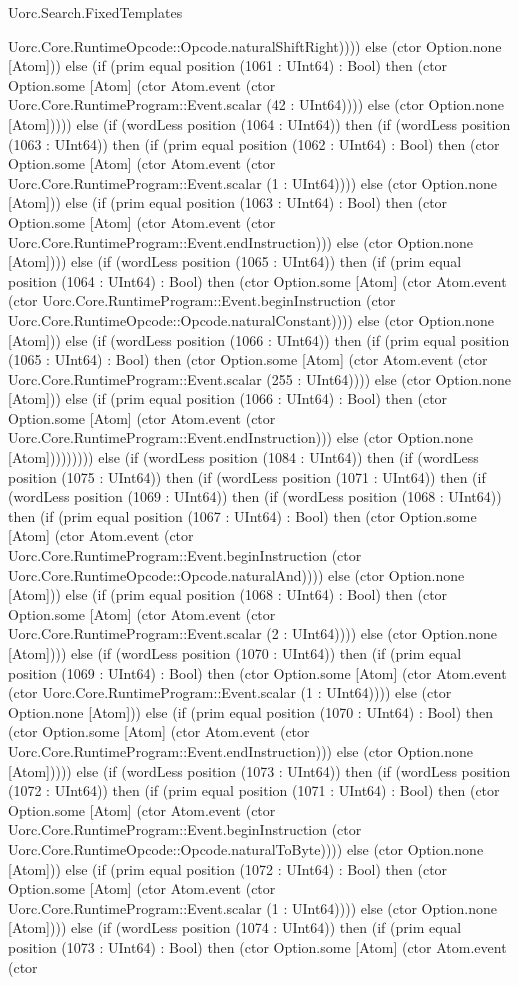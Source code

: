 \begin{lexlean}{Uorc.Search.FixedTemplates}
\begin{semanticmodule}
{Uorc.Core.RuntimeOpcode::Opcode.naturalShiftRight)))) else (ctor Option.none [Atom])) else (if (prim equal position (1061 : UInt64) : Bool) then (ctor Option.some [Atom] (ctor Atom.event (ctor Uorc.Core.RuntimeProgram::Event.scalar (42 : UInt64)))) else (ctor Option.none [Atom])))) else (if (wordLess position (1064 : UInt64)) then (if (wordLess position (1063 : UInt64)) then (if (prim equal position (1062 : UInt64) : Bool) then (ctor Option.some [Atom] (ctor Atom.event (ctor Uorc.Core.RuntimeProgram::Event.scalar (1 : UInt64)))) else (ctor Option.none [Atom])) else (if (prim equal position (1063 : UInt64) : Bool) then (ctor Option.some [Atom] (ctor Atom.event (ctor Uorc.Core.RuntimeProgram::Event.endInstruction))) else (ctor Option.none [Atom]))) else (if (wordLess position (1065 : UInt64)) then (if (prim equal position (1064 : UInt64) : Bool) then (ctor Option.some [Atom] (ctor Atom.event (ctor Uorc.Core.RuntimeProgram::Event.beginInstruction (ctor Uorc.Core.RuntimeOpcode::Opcode.naturalConstant)))) else (ctor Option.none [Atom])) else (if (wordLess position (1066 : UInt64)) then (if (prim equal position (1065 : UInt64) : Bool) then (ctor Option.some [Atom] (ctor Atom.event (ctor Uorc.Core.RuntimeProgram::Event.scalar (255 : UInt64)))) else (ctor Option.none [Atom])) else (if (prim equal position (1066 : UInt64) : Bool) then (ctor Option.some [Atom] (ctor Atom.event (ctor Uorc.Core.RuntimeProgram::Event.endInstruction))) else (ctor Option.none [Atom])))))))) else (if (wordLess position (1084 : UInt64)) then (if (wordLess position (1075 : UInt64)) then (if (wordLess position (1071 : UInt64)) then (if (wordLess position (1069 : UInt64)) then (if (wordLess position (1068 : UInt64)) then (if (prim equal position (1067 : UInt64) : Bool) then (ctor Option.some [Atom] (ctor Atom.event (ctor Uorc.Core.RuntimeProgram::Event.beginInstruction (ctor Uorc.Core.RuntimeOpcode::Opcode.naturalAnd)))) else (ctor Option.none [Atom])) else (if (prim equal position (1068 : UInt64) : Bool) then (ctor Option.some [Atom] (ctor Atom.event (ctor Uorc.Core.RuntimeProgram::Event.scalar (2 : UInt64)))) else (ctor Option.none [Atom]))) else (if (wordLess position (1070 : UInt64)) then (if (prim equal position (1069 : UInt64) : Bool) then (ctor Option.some [Atom] (ctor Atom.event (ctor Uorc.Core.RuntimeProgram::Event.scalar (1 : UInt64)))) else (ctor Option.none [Atom])) else (if (prim equal position (1070 : UInt64) : Bool) then (ctor Option.some [Atom] (ctor Atom.event (ctor Uorc.Core.RuntimeProgram::Event.endInstruction))) else (ctor Option.none [Atom])))) else (if (wordLess position (1073 : UInt64)) then (if (wordLess position (1072 : UInt64)) then (if (prim equal position (1071 : UInt64) : Bool) then (ctor Option.some [Atom] (ctor Atom.event (ctor Uorc.Core.RuntimeProgram::Event.beginInstruction (ctor Uorc.Core.RuntimeOpcode::Opcode.naturalToByte)))) else (ctor Option.none [Atom])) else (if (prim equal position (1072 : UInt64) : Bool) then (ctor Option.some [Atom] (ctor Atom.event (ctor Uorc.Core.RuntimeProgram::Event.scalar (1 : UInt64)))) else (ctor Option.none [Atom]))) else (if (wordLess position (1074 : UInt64)) then (if (prim equal position (1073 : UInt64) : Bool) then (ctor Option.some [Atom] (ctor Atom.event (ctor }
\end{semanticmodule}
\end{lexlean}
